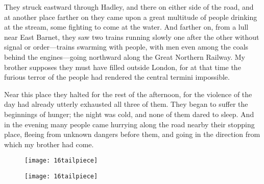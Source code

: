 They struck eastward through Hadley, and there on either side of the road, and at another place farther on they came upon a great multitude of people drinking at the stream, some fighting to come at the water. And farther on, from a lull near East Barnet, they saw two trains running slowly one after the other without signal or order—trains swarming with people, with men even among the coals behind the engines—going northward along the Great Northern Railway. My brother supposes they must have filled outside London, for at that time the furious terror of the people had rendered the central termini impossible.

Near this place they halted for the rest of the afternoon, for the violence of the day had already utterly exhausted all three of them. They began to suffer the beginnings of hunger; the night was cold, and none of them dared to sleep. And in the evening many people came hurrying along the road nearby their stopping place, fleeing from unknown dangers before them, and going in the direction from which my brother had come.

\begin{a4}
	\begin{figure}[b!]
		\centering
		\texttt{[image: 16tailpiece]}
	\end{figure}
\end{a4}

\begin{letter}
	\begin{figure}[b!]
		\centering
		\texttt{[image: 16tailpiece]}
	\end{figure}
\end{letter}
